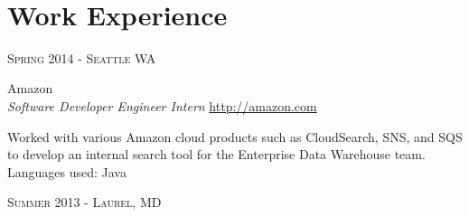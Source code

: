 \documentclass[10pt]{article} %
\begin{document}
\color{text1} %


\par{\\ %
	

\begin{minipage}[t]{0.5\textwidth} %
\vspace{0pt} %
	

\section{Work Experience} 

{\raggedleft\textsc{Spring 2014 - Seattle WA}\par}

{\raggedright\large Amazon \\
\textit{Software Developer Engineer Intern}  \hfill {\small \href{http://amazon.com}{http://amazon.com}}\\ [5pt]}

\normalsize{Worked with various Amazon cloud products such as CloudSearch, SNS, and SQS to develop an internal search tool for the Enterprise Data Warehouse team. Languages used: Java}\\


{\raggedleft\textsc{Summer 2013 - Laurel, MD}\par}


\end{minipage}}
\end{document}
